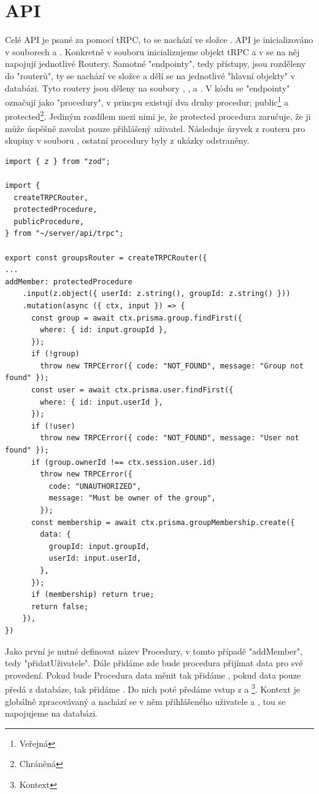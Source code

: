 \section{API}
\label{sec:api}

Celé API je psané za pomocí tRPC, to se nachází ve složce .
API je inicializováno v souborech  a . Konkretně v souboru  inicializujeme objekt tRPC a v  se na něj napojují jednotlivé Routery. Samotné "endpointy", tedy přístupy, jsou rozděleny do "routerů", ty se nachází ve složce  a dělí se na jednotlivé "hlavní objekty" v databázi. Tyto routery jsou děleny na soubory , ,  a . V kódu se "endpointy" označují jako "procedury", v princpu existují dva druhy procedur; public\footnote{Veřejná} a protected\footnote{Chráněná}. Jediným rozdílem mezi nimi je, že protected procedura zaručuje, že ji může úspěšně zavolat pouze přihlášený uživatel.
Následuje úryvek z routeru pro skupiny v souboru , ostatní procedury byly z ukázky odstraněny.
\begin{lstlisting}[caption={Procedura na přidání uživatele do skupiny}]
import { z } from "zod";

import {
  createTRPCRouter,
  protectedProcedure,
  publicProcedure,
} from "~/server/api/trpc";

export const groupsRouter = createTRPCRouter({
...
addMember: protectedProcedure
    .input(z.object({ userId: z.string(), groupId: z.string() }))
    .mutation(async ({ ctx, input }) => {
      const group = await ctx.prisma.group.findFirst({
        where: { id: input.groupId },
      });
      if (!group)
        throw new TRPCError({ code: "NOT_FOUND", message: "Group not found" });
      const user = await ctx.prisma.user.findFirst({
        where: { id: input.userId },
      });
      if (!user)
        throw new TRPCError({ code: "NOT_FOUND", message: "User not found" });
      if (group.ownerId !== ctx.session.user.id)
        throw new TRPCError({
          code: "UNAUTHORIZED",
          message: "Must be owner of the group",
        });
      const membership = await ctx.prisma.groupMembership.create({
        data: {
          groupId: input.groupId,
          userId: input.userId,
        },
      });
      if (membership) return true;
      return false;
    }),
})
\end{lstlisting}
Jako první je nutné definovat název Procedury, v tomto případě "addMember", tedy "přidatUživatele". Dále přidáme  zde bude procedura přijímat data pro své provedení. Pokud bude Procedura data měnit tak přidáme , pokud data pouze předá z databáze, tak přidáme . Do nich poté předáme vstup z  a \footnote{Kontext}. Kontext je globálně zpracovávaný a nachází se v něm  přihlášeného uživatele a , tou se napojujeme na databázi.
\newpage
